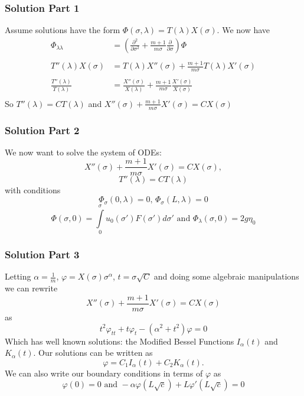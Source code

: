 	
	
		\begin{frame}
		\frametitle{Solution Part 1}
				Assume solutions have the form $\Phi(\sigma,\lambda)=T(\lambda)X(\sigma)$.  We now have
				\begin{align*}
				\Phi_{\lambda \lambda}&=\left(\frac{\partial^2}{\partial \sigma^2}+\frac{m+1}{m\sigma}\frac{\partial}{\partial \sigma}\right)\Phi\\\\
				T''(\lambda)X(\sigma)&=T(\lambda)X''(\sigma)+\frac{m+1}{m\sigma}T(\lambda)X'(\sigma)\\\\
				\frac{T''(\lambda)}{T(\lambda)}&=\frac{X''(\sigma)}{X(\lambda)}+\frac{m+1}{m\sigma}\frac{X'(\sigma)}{X(\sigma)}\\
				\end{align*}
				So $T''(\lambda)=CT(\lambda)$ and $X''(\sigma)+\frac{m+1}{m\sigma}X'(\sigma)=C X(\sigma)$
	\end{frame}
	
	
	
	\begin{frame}
		\frametitle{Solution Part 2}
		 We now want to solve the system of ODEs:
		\[X''(\sigma)+\frac{m+1}{m\sigma}X'(\sigma)=C X(\sigma),\]
		\[T''(\lambda)=CT(\lambda)\]
		with conditions
		\[\Phi_\sigma (0,\lambda)=0\text{, }\Phi_\sigma (L,\lambda)=0\]
		\[ \Phi(\sigma,0)=\int\limits_0^\sigma u_0(\sigma ')F(\sigma ')d \sigma'\text{ and }\Phi_\lambda(\sigma,0)=2g\eta_0\]
	\end{frame}
	
	
	
	
		\begin{frame}
		\frametitle{Solution Part 3}
		 Letting $\alpha=\frac 1m$, $\varphi=X(\sigma)\sigma ^\alpha$, $t=\sigma \sqrt{C}$ and doing some algebraic manipulations we can rewrite 
		\[X''(\sigma)+\frac{m+1}{m\sigma}X'(\sigma)=C X(\sigma)\]
		as
		\[t^2 \varphi_{tt}+t \varphi_t-(\alpha^2+t^2)\varphi=0\]
		Which has well known solutions: the Modified Bessel Functions $I_\alpha(t)$ and $K_\alpha(t)$. Our solutions can be written as $$\varphi=C_1I_\alpha(t)+C_2K_\alpha(t).$$ We can also write our boundary conditions in terms of $\varphi$ as 
		\[\varphi(0)=0\text{ and }-\alpha\varphi(L\sqrt{c})+L\varphi'(L\sqrt{c})=0\]
	\end{frame}
	
